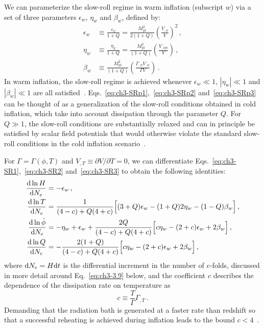 We can parameterize the slow-roll regime in warm inflation (subscript ${w}$) via a set of three parameters $\epsilon_{w}$, $\eta_{w}$ and $\beta_{w}$, defined by:
\begin{align}
\epsilon_{w} & \equiv \frac{\epsilon_{V}}{1+Q}=\frac{M_{\mathrm{pl}}^{2}}{2(1+Q)}\left(\frac{V_{, \phi}}{V}\right)^{2}\,, \label{eq:ch3-SRp1} \\
\eta_{w} & \equiv \frac{\eta_{V}}{1+Q}=\frac{M_{\mathrm{pl}}^{2}}{(1+Q)}\left(\frac{V_{, \phi \phi}}{V}\right)\,, \label{eq:ch3-SRp2} \\
\beta_{w} & \equiv \frac{M_{\mathrm{pl}}^{2}}{(1+Q)}\left(\frac{\Gamma_{, \phi} V_{, \phi}}{\Gamma V}\right) \label{eq:ch3-SRp3}\,.
\end{align}
In warm inflation, the slow-roll regime is achieved whenever $\epsilon_w \ll 1$, $|\eta_w| \ll 1$ and $|\beta_w| \ll 1$ are all satisfied~\cite{Taylor:2000ze, Hall:2003zp, Bastero-Gil:2004oun, Moss:2008yb}. Eqs.~\ref{eq:ch3-SRp1},~\ref{eq:ch3-SRp2} and~\ref{eq:ch3-SRp3} can be thought of as a generalization of the slow-roll conditions obtained in cold inflation, which take into account dissipation through the parameter $Q$. For $Q\gg 1$, the slow-roll conditions are substantially relaxed and can in principle be satisfied by scalar field potentials that would otherwise violate the standard slow-roll conditions in the cold inflation scenario~\cite{Motaharfar:2018zyb,Das:2020xmh,Kamali:2021ugx,Santos:2022exm}.

For $\Gamma=\Gamma(\phi, T)$ and $V_{,T} \equiv \partial V/\partial T =0$, we can differentiate Eqs.~\ref{eq:ch3-SR1},~\ref{eq:ch3-SR2} and~\ref{eq:ch3-SR3} to obtain the following identities:
\begin{align}
    \frac{{\rm d}\ln H}{{\rm d}N_e}&=-\epsilon_w\,, \label{eq:ch3-d1} \\
    \frac{{\rm d}\ln T}{{\rm d}N_e}&=\frac{1}{(4-c)+Q(4+c)}\Big[(3+Q)\epsilon_w-(1+Q)2\eta_w- (1-Q)\beta_w\Big]\,, \label{eq:ch3-d2} \\
    \frac{{\rm d}\ln \Dot{\phi}}{{\rm d}N_e}&=-\eta_w+\epsilon_w+\frac{2Q}{(4-c)+Q(4+c)}\Big[c\eta_w- (2+c)\epsilon_w+ 2\beta_w\Big]\,, \label{eq:ch3-d3} \\
    \frac{{\rm d}\ln Q}{{\rm d}N_e}&= -\frac{2(1+Q)}{(4-c)+Q(4+c)}\Big[c\eta_w- (2+c)\epsilon_w + 2\beta_w\Big]\,, \label{eq:ch3-d4}
\end{align}
where ${\rm d}N_e=H{\rm d}t$ is the differential increment in the number of $e$-folds, discussed in more detail around Eq.~\ref{eq:ch3-3.9} below, and the coefficient $c$ describes the dependence of the dissipation rate on temperature as
\begin{equation}
    \label{eq:ch3-def-c}
    c \equiv \frac{T}{\Gamma}\Gamma_{,T}\,.
\end{equation}
Demanding that the radiation bath is generated at a faster rate than redshift so that a successful reheating is achieved during inflation leads to the bound $c < 4$~\cite{Bastero-Gil:2011rva}.

